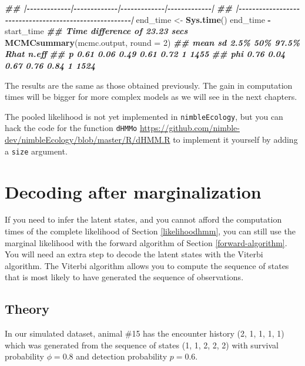 \documentclass[
  12pt,
]{krantz}
\newenvironment{Shaded}{\begin{snugshade}}{\end{snugshade}}
\newcommand{\AttributeTok}[1]{\textcolor[rgb]{0.13,0.29,0.53}{#1}}
\newcommand{\DecValTok}[1]{\textcolor[rgb]{0.00,0.00,0.81}{#1}}
\newcommand{\DocumentationTok}[1]{\textcolor[rgb]{0.56,0.35,0.01}{\textbf{\textit{#1}}}}
\newcommand{\FunctionTok}[1]{\textcolor[rgb]{0.13,0.29,0.53}{\textbf{#1}}}
\newcommand{\NormalTok}[1]{#1}
\newcommand{\OtherTok}[1]{\textcolor[rgb]{0.56,0.35,0.01}{#1}}
\newcommand{\SpecialCharTok}[1]{\textcolor[rgb]{0.81,0.36,0.00}{\textbf{#1}}}
\begin{document}
\begin{Shaded}
\begin{Highlighting}[]
\DocumentationTok{\#\# |{-}{-}{-}{-}{-}{-}{-}{-}{-}{-}{-}{-}{-}|{-}{-}{-}{-}{-}{-}{-}{-}{-}{-}{-}{-}{-}|{-}{-}{-}{-}{-}{-}{-}{-}{-}{-}{-}{-}{-}|{-}{-}{-}{-}{-}{-}{-}{-}{-}{-}{-}{-}{-}|}
\DocumentationTok{\#\# |{-}{-}{-}{-}{-}{-}{-}{-}{-}{-}{-}{-}{-}{-}{-}{-}{-}{-}{-}{-}{-}{-}{-}{-}{-}{-}{-}{-}{-}{-}{-}{-}{-}{-}{-}{-}{-}{-}{-}{-}{-}{-}{-}{-}{-}{-}{-}{-}{-}{-}{-}{-}{-}{-}{-}|}
\NormalTok{end\_time }\OtherTok{\textless{}{-}} \FunctionTok{Sys.time}\NormalTok{()}
\NormalTok{end\_time }\SpecialCharTok{{-}}\NormalTok{ start\_time}
\DocumentationTok{\#\# Time difference of 23.23 secs}
\FunctionTok{MCMCsummary}\NormalTok{(mcmc.output, }\AttributeTok{round =} \DecValTok{2}\NormalTok{)}
\DocumentationTok{\#\#     mean   sd 2.5\%  50\% 97.5\% Rhat n.eff}
\DocumentationTok{\#\# p   0.61 0.06 0.49 0.61  0.72    1  1455}
\DocumentationTok{\#\# phi 0.76 0.04 0.67 0.76  0.84    1  1524}
\end{Highlighting}
\end{Shaded}

The results are the same as those obtained previously. The gain in computation times will be bigger for more complex models as we will see in the next chapters.

The pooled likelihood is not yet implemented in \texttt{nimbleEcology}, but you can hack the code for the function \texttt{dHMMo} \url{https://github.com/nimble-dev/nimbleEcology/blob/master/R/dHMM.R} to implement it yourself by adding a \texttt{size} argument.

\section{Decoding after marginalization}\label{decoding}

If you need to infer the latent states, and you cannot afford the computation times of the complete likelihood of Section \ref{likelihoodhmm}, you can still use the marginal likelihood with the forward algorithm of Section \ref{forward-algorithm}. You will need an extra step to decode the latent states with the Viterbi algorithm. The Viterbi algorithm allows you to compute the sequence of states that is most likely to have generated the sequence of observations.

\subsection{Theory}\label{viterbi-theory}

In our simulated dataset, animal \#15 has the encounter history (2, 1, 1, 1, 1) which was generated from the sequence of states (1, 1, 2, 2, 2) with survival probability \(\phi = 0.8\) and detection probability \(p = 0.6\).
\end{document}
